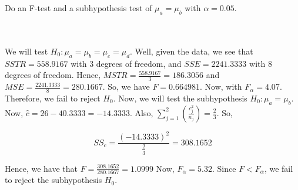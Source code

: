 Do an F-test and a subhypothesis test of $\mu_a=\mu_b$ with $\alpha=0.05$.\\\\

\begin{solution}\renewcommand{\qedsymbol}{}\ \\
    We will test $H_0:\mu_a=\mu_b=\mu_c=\mu_d$. Well, given the data, we see that $SSTR=558.9167$ with
    $3$ degrees of freedom, and $SSE=2241.3333$ with $8$ degrees of freedom. Hence,
    $MSTR=\frac{558.9167}{3}=186.3056$ and $MSE=\frac{2241.3333}{8}=280.1667$. So, we have $F=0.664981$.
    Now, with $F_{\alpha}=4.07$. Therefore, we fail to reject $H_0$. Now, we will test the subhypothesis
    $H_0:\mu_a=\mu_b$. Now, $\hat{c}=26-40.3333=-14.3333$. Also,
    $\sum_{j=1}^2(\frac{c_j^2}{n_j})=\frac23$. So,
    
    $$SS_c=\frac{(-14.3333)^2}{\frac23}=308.1652$$
    
    Hence, we have that $F=\frac{308.1652}{280.1667}=1.0999$ Now, $F_{\alpha}=5.32$. Since
    $F<F_{\alpha}$, we fail to reject the subhypothesis $H_0$.

\end{solution}